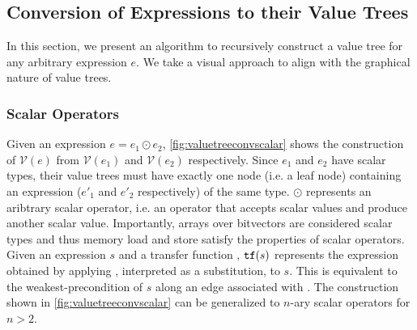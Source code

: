\subsection{Conversion of Expressions to their Value Trees}
\label{sec:valuetreeconv}
In this section, we present an algorithm to recursively construct a value tree for any arbitrary expression $e$.
We take a visual approach to align with the graphical nature of value trees.

\subsubsection{Scalar Operators}
Given an expression $e = e_1 \odot e_2$,
\cref{fig:valuetreeconvscalar} shows the construction of $\mathcal{V}(e)$
from $\mathcal{V}(e_1)$ and $\mathcal{V}(e_2)$ respectively.
Since $e_1$ and $e_2$ have scalar types, their value trees must have exactly one
node (i.e. a leaf node) containing an expression ($e'_1$ and $e'_2$ respectively) of the same type.
$\odot$ represents an aribtrary scalar operator, i.e. an operator that accepts
scalar values and produce another scalar value.
Importantly, arrays over bitvectors are considered scalar types and thus
memory load and store satisfy the properties of scalar operators.
Given an expression $s$ and a transfer function \xfer{}, ${\tt tf}{}(s)$
represents the expression obtained by applying \xfer{}, interpreted as a substitution,
to $s$. This is equivalent to the weakest-precondition of $s$ along an edge associated
with \xfer{}.
The construction shown in \cref{fig:valuetreeconvscalar} can be generalized to
$n$-ary scalar operators for $n>2$.
